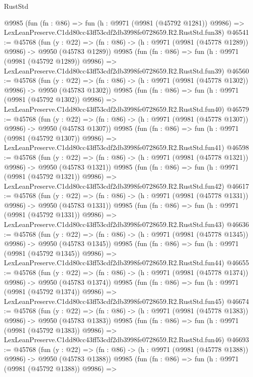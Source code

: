 \begin{lexlean}{RustStd}
\begin{coremodule}
    @9985
    (fun (fn : @86) =>
    fun (h : @9971 (@9981 (@45792 @1281)) @9986) =>
    LexLeanPreserve.C1dd80cc43ff53cdf2db3998fe0728659.R2.RustStd.fun38)
@46541 := @45768
    (fun (y : @22) =>
    (fn : @86) -> (h : @9971 (@9981 (@45778 @1289)) @9986) -> @9950 (@45783 @1289))
    @9985
    (fun (fn : @86) =>
    fun (h : @9971 (@9981 (@45792 @1289)) @9986) =>
    LexLeanPreserve.C1dd80cc43ff53cdf2db3998fe0728659.R2.RustStd.fun39)
@46560 := @45768
    (fun (y : @22) =>
    (fn : @86) -> (h : @9971 (@9981 (@45778 @1302)) @9986) -> @9950 (@45783 @1302))
    @9985
    (fun (fn : @86) =>
    fun (h : @9971 (@9981 (@45792 @1302)) @9986) =>
    LexLeanPreserve.C1dd80cc43ff53cdf2db3998fe0728659.R2.RustStd.fun40)
@46579 := @45768
    (fun (y : @22) =>
    (fn : @86) -> (h : @9971 (@9981 (@45778 @1307)) @9986) -> @9950 (@45783 @1307))
    @9985
    (fun (fn : @86) =>
    fun (h : @9971 (@9981 (@45792 @1307)) @9986) =>
    LexLeanPreserve.C1dd80cc43ff53cdf2db3998fe0728659.R2.RustStd.fun41)
@46598 := @45768
    (fun (y : @22) =>
    (fn : @86) -> (h : @9971 (@9981 (@45778 @1321)) @9986) -> @9950 (@45783 @1321))
    @9985
    (fun (fn : @86) =>
    fun (h : @9971 (@9981 (@45792 @1321)) @9986) =>
    LexLeanPreserve.C1dd80cc43ff53cdf2db3998fe0728659.R2.RustStd.fun42)
@46617 := @45768
    (fun (y : @22) =>
    (fn : @86) -> (h : @9971 (@9981 (@45778 @1331)) @9986) -> @9950 (@45783 @1331))
    @9985
    (fun (fn : @86) =>
    fun (h : @9971 (@9981 (@45792 @1331)) @9986) =>
    LexLeanPreserve.C1dd80cc43ff53cdf2db3998fe0728659.R2.RustStd.fun43)
@46636 := @45768
    (fun (y : @22) =>
    (fn : @86) -> (h : @9971 (@9981 (@45778 @1345)) @9986) -> @9950 (@45783 @1345))
    @9985
    (fun (fn : @86) =>
    fun (h : @9971 (@9981 (@45792 @1345)) @9986) =>
    LexLeanPreserve.C1dd80cc43ff53cdf2db3998fe0728659.R2.RustStd.fun44)
@46655 := @45768
    (fun (y : @22) =>
    (fn : @86) -> (h : @9971 (@9981 (@45778 @1374)) @9986) -> @9950 (@45783 @1374))
    @9985
    (fun (fn : @86) =>
    fun (h : @9971 (@9981 (@45792 @1374)) @9986) =>
    LexLeanPreserve.C1dd80cc43ff53cdf2db3998fe0728659.R2.RustStd.fun45)
@46674 := @45768
    (fun (y : @22) =>
    (fn : @86) -> (h : @9971 (@9981 (@45778 @1383)) @9986) -> @9950 (@45783 @1383))
    @9985
    (fun (fn : @86) =>
    fun (h : @9971 (@9981 (@45792 @1383)) @9986) =>
    LexLeanPreserve.C1dd80cc43ff53cdf2db3998fe0728659.R2.RustStd.fun46)
@46693 := @45768
    (fun (y : @22) =>
    (fn : @86) -> (h : @9971 (@9981 (@45778 @1388)) @9986) -> @9950 (@45783 @1388))
    @9985
    (fun (fn : @86) =>
    fun (h : @9971 (@9981 (@45792 @1388)) @9986) =>

\end{coremodule}
\end{lexlean}
